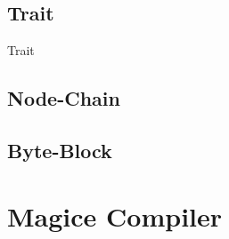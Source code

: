 \subsection{Trait}
{Trait}

\subsection{Node-Chain}


\subsection{Byte-Block}


\section{Magice Compiler}


